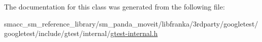 The documentation for this class was generated from the following file\+:\begin{DoxyCompactItemize}
\item 
smacc\+\_\+sm\+\_\+reference\+\_\+library/sm\+\_\+panda\+\_\+moveit/libfranka/3rdparty/googletest/googletest/include/gtest/internal/\hyperlink{gtest-internal_8h}{gtest-\/internal.\+h}\end{DoxyCompactItemize}

